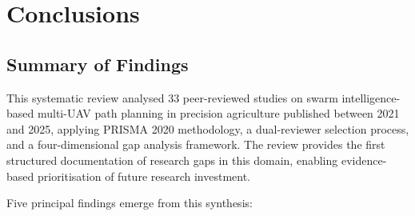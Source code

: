 \documentclass[review,3p,times]{elsarticle}
\begin{document}
\section{Conclusions}

\subsection{Summary of Findings}

This systematic review analysed 33 peer-reviewed studies on swarm intelligence-based multi-UAV path planning in precision agriculture published between 2021 and 2025, applying PRISMA 2020 methodology, a dual-reviewer selection process, and a four-dimensional gap analysis framework. The review provides the first structured documentation of research gaps in this domain, enabling evidence-based prioritisation of future research investment.

Five principal findings emerge from this synthesis:
\end{document}
